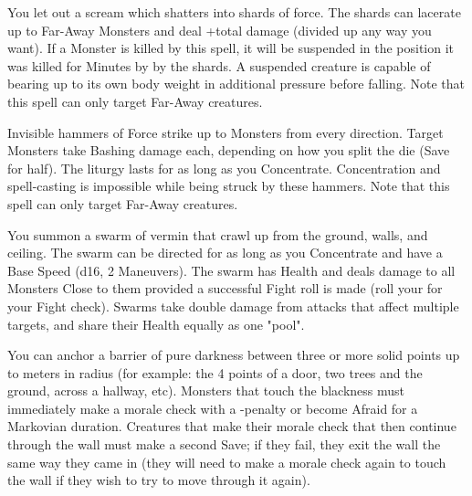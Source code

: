 {\MYSTERY [
  Name = Shrikeblast,
  Link = arcana-mystery-shrikeblast,
  Paradigm = Force,
  Save = Y (half),
  Duration = Instant,
  Target = Far-Away Target(s)
]

You let out a scream which shatters into shards of force.  The shards can lacerate up to \DICE  Far-Away Monsters and deal \SUMDICE+\DICE total damage (divided up any way you want).  If a Monster is killed by this spell, it will be suspended in the position it was killed for \SUMDICE Minutes by by the shards. A suspended creature is capable of bearing up to its own body weight in additional pressure before falling.  Note that this spell can only target Far-Away creatures.

\MYSTERY [
  Name = Storm of Hammers,
  Link = arcana-mystery-storm-of-hammers,
  Paradigm = Force,
  Save = Y (half),
  Duration = Concentration,
  Target = Far-Away Target(s)
]

Invisible hammers of Force strike up to \DICE Monsters from every direction.  Target Monsters take \DICE Bashing damage each, depending on how you split the die (Save for half).  The liturgy lasts for as long as you Concentrate.  Concentration and spell-casting is impossible while being struck by these hammers. Note that this spell can only target Far-Away creatures.

\MYSTERY [
  Name = Vermin Swarm,
  Link = arcana-mystery-vermin-swarm,
  Paradigm = Biomancy,
  Save = n/a,
  Duration = Concentration,
  Target = Close or Nearby
]

You summon a swarm of vermin that crawl up from the ground, walls, and ceiling.  The swarm can be directed for as long as you Concentrate and have a Base Speed (d16, 2 Maneuvers).  The swarm has \SUMDICE Health and deals \DICE damage to all Monsters Close to them provided a successful Fight roll is made (roll your \FOC for your Fight check).  Swarms take double damage from attacks that affect multiple targets, and share their Health equally as one "pool".  

\MYSTERY [
  Name = Wall of Gloom,
  Link = arcana-mystery-wall-of-gloom,
  Paradigm = Mind,
  Save = See Below,
  Duration = Markovian,
  Target = Nearby or Far-Away
]

You can anchor a barrier of pure darkness between three or more solid points up to \DICE meters in radius (for example: the 4 points of a door, two trees and the ground, across a hallway, etc).  Monsters that touch the blackness must immediately make a morale check with a -\DICE penalty or become Afraid for a Markovian duration.  Creatures that make their morale check that then continue through the wall must make a second Save; if they fail, they exit the wall the same way they came in (they will need to make a morale check again to touch the wall if they wish to try to move through it again).   






}
